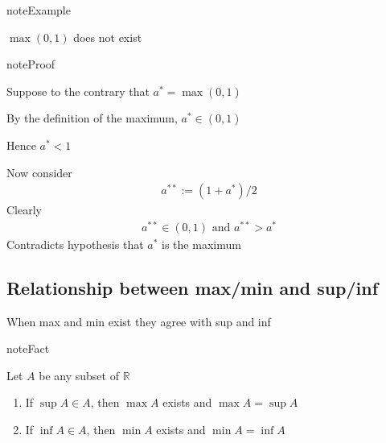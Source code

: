 \documentclass[letterpaper,10pt,english]{jupyterBook}
\begin{document}
\begin{sphinxadmonition}{note}{Example}

\sphinxAtStartPar
\(\max (0, 1)\) does not exist
\end{sphinxadmonition}

\begin{sphinxadmonition}{note}{Proof}

\sphinxAtStartPar
Suppose to the contrary that \(a^* = \max (0, 1)\)

\sphinxAtStartPar
By the definition of the maximum, \(a^* \in (0, 1)\)

\sphinxAtStartPar
Hence \(a^* < 1\)

\sphinxAtStartPar
Now consider
\begin{equation*}
\begin{split}
%
a^{**} := (1 + a^*)/2
%
\end{split}
\end{equation*}
\sphinxAtStartPar
Clearly
\begin{equation*}
\begin{split}
%
a^{**} \in (0, 1) \text{ and } a^{**} > a^*
%
\end{split}
\end{equation*}
\sphinxAtStartPar
Contradicts hypothesis that \(a^*\) is the maximum
\end{sphinxadmonition}


\subsection{Relationship between max/min and sup/inf}
\label{\detokenize{06.optimization_fundamentals:relationship-between-max-min-and-sup-inf}}
\sphinxAtStartPar
When max and min exist they agree with sup and inf

\begin{sphinxadmonition}{note}{Fact}

\sphinxAtStartPar
Let \(A\) be any subset of \(\mathbb{R}\)
\begin{enumerate}
%
\item {} 
\sphinxAtStartPar
If \(\sup A \in A\), then \(\max A\) exists and \(\max A = \sup A\)

\item {} 
\sphinxAtStartPar
If \(\inf A \in A\), then \(\min A\) exists and \(\min A = \inf A\)

\end{enumerate}
\end{sphinxadmonition}
\end{document}
